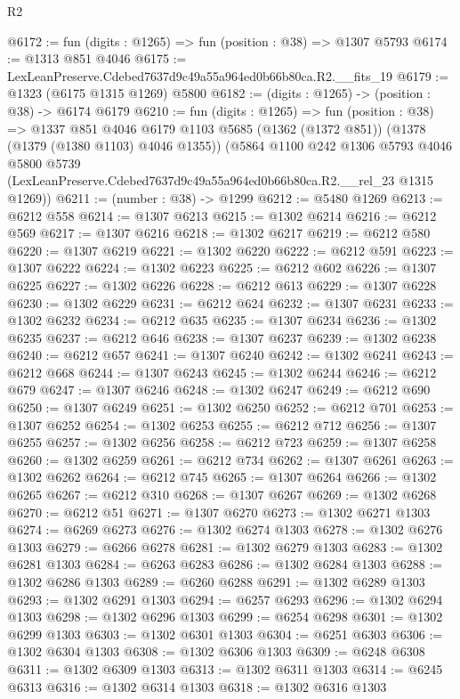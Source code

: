 \begin{lexlean}{R2}
\begin{coremodule}
@6172 := fun (digits : @1265) => fun (position : @38) => @1307 @5793
@6174 := @1313 @851 @4046
@6175 := LexLeanPreserve.Cdebed7637d9c49a55a964ed0b66b80ca.R2.__fits_19
@6179 := @1323 (@6175 @1315 @1269) @5800
@6182 := (digits : @1265) -> (position : @38) -> @6174 @6179
@6210 := fun (digits : @1265) =>
  fun (position : @38) =>
  @1337
    @851
    @4046
    @6179
    @1103
    @5685
    (@1362 (@1372 @851))
    (@1378 (@1379 (@1380 @1103) @4046 @1355))
    (@5864
      @1100
      @242
      @1306
      @5793
      @4046
      @5800
      @5739
      (LexLeanPreserve.Cdebed7637d9c49a55a964ed0b66b80ca.R2.__rel_23 @1315 @1269))
@6211 := (number : @38) -> @1299
@6212 := @5480 @1269
@6213 := @6212 @558
@6214 := @1307 @6213
@6215 := @1302 @6214
@6216 := @6212 @569
@6217 := @1307 @6216
@6218 := @1302 @6217
@6219 := @6212 @580
@6220 := @1307 @6219
@6221 := @1302 @6220
@6222 := @6212 @591
@6223 := @1307 @6222
@6224 := @1302 @6223
@6225 := @6212 @602
@6226 := @1307 @6225
@6227 := @1302 @6226
@6228 := @6212 @613
@6229 := @1307 @6228
@6230 := @1302 @6229
@6231 := @6212 @624
@6232 := @1307 @6231
@6233 := @1302 @6232
@6234 := @6212 @635
@6235 := @1307 @6234
@6236 := @1302 @6235
@6237 := @6212 @646
@6238 := @1307 @6237
@6239 := @1302 @6238
@6240 := @6212 @657
@6241 := @1307 @6240
@6242 := @1302 @6241
@6243 := @6212 @668
@6244 := @1307 @6243
@6245 := @1302 @6244
@6246 := @6212 @679
@6247 := @1307 @6246
@6248 := @1302 @6247
@6249 := @6212 @690
@6250 := @1307 @6249
@6251 := @1302 @6250
@6252 := @6212 @701
@6253 := @1307 @6252
@6254 := @1302 @6253
@6255 := @6212 @712
@6256 := @1307 @6255
@6257 := @1302 @6256
@6258 := @6212 @723
@6259 := @1307 @6258
@6260 := @1302 @6259
@6261 := @6212 @734
@6262 := @1307 @6261
@6263 := @1302 @6262
@6264 := @6212 @745
@6265 := @1307 @6264
@6266 := @1302 @6265
@6267 := @6212 @310
@6268 := @1307 @6267
@6269 := @1302 @6268
@6270 := @6212 @51
@6271 := @1307 @6270
@6273 := @1302 @6271 @1303
@6274 := @6269 @6273
@6276 := @1302 @6274 @1303
@6278 := @1302 @6276 @1303
@6279 := @6266 @6278
@6281 := @1302 @6279 @1303
@6283 := @1302 @6281 @1303
@6284 := @6263 @6283
@6286 := @1302 @6284 @1303
@6288 := @1302 @6286 @1303
@6289 := @6260 @6288
@6291 := @1302 @6289 @1303
@6293 := @1302 @6291 @1303
@6294 := @6257 @6293
@6296 := @1302 @6294 @1303
@6298 := @1302 @6296 @1303
@6299 := @6254 @6298
@6301 := @1302 @6299 @1303
@6303 := @1302 @6301 @1303
@6304 := @6251 @6303
@6306 := @1302 @6304 @1303
@6308 := @1302 @6306 @1303
@6309 := @6248 @6308
@6311 := @1302 @6309 @1303
@6313 := @1302 @6311 @1303
@6314 := @6245 @6313
@6316 := @1302 @6314 @1303
@6318 := @1302 @6316 @1303

\end{coremodule}
\end{lexlean}
